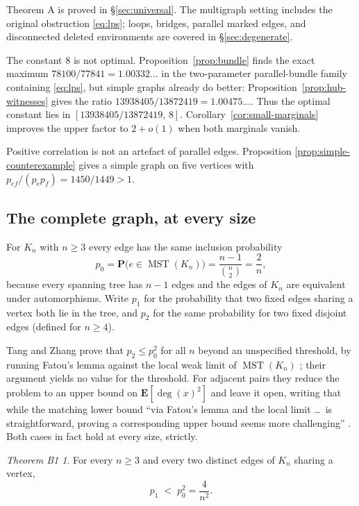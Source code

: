 \documentclass[11pt,a4paper]{amsart}
\theoremstyle{plain}
\theoremstyle{definition}
\theoremstyle{remark}
\newtheorem*{theoremB1}{Theorem B1}
\newcommand{\MST}{\operatorname{MST}}
\newcommand{\E}{\mathbf{E}}
\newcommand{\PP}{\mathbf{P}}
\DeclareMathOperator{\dg}{deg}
\begin{document}
Theorem A is proved in \S\ref{sec:universal}. The multigraph setting includes
the original obstruction \eqref{eq:lps}; loops, bridges, parallel marked edges,
and disconnected deleted environments are covered in
\S\ref{sec:degenerate}.

The constant $8$ is not optimal. Proposition~\ref{prop:bundle} finds the exact
maximum $78100/77841=1.00332\ldots$ in the two-parameter parallel-bundle family
containing \eqref{eq:lps}, but simple graphs already do better:
Proposition~\ref{prop:hub-witnesses} gives the ratio
$13938405/13872419=1.00475\ldots$. Thus the optimal constant lies in
$[13938405/13872419,\,8]$. Corollary~\ref{cor:small-marginals} improves the
upper factor to $2+o(1)$ when both marginals vanish.

Positive correlation is not an artefact of parallel edges. Proposition
\ref{prop:simple-counterexample} gives a simple graph on five vertices with
$p_{ef}/(p_ep_f)=1450/1449>1$.

\subsection{The complete graph, at every size}
\label{ssec:introB}

For $K_n$ with $n\ge3$ every edge has the same inclusion probability
\begin{equation}
\label{eq:p0}
p_0=\PP\bigl(e\in\MST(K_n)\bigr)=\frac{n-1}{\binom n2}=\frac2n ,
\end{equation}
because every spanning tree has $n-1$ edges and the edges of $K_n$ are
equivalent under automorphisms. Write $p_1$ for the probability that two fixed
edges sharing a vertex both lie in the tree, and $p_2$ for the same probability
for two fixed disjoint edges (defined for $n\ge4$).

Tang and Zhang \cite[Theorem 1.1]{TZ} prove that $p_2\le p_0^2$ for all $n$
beyond an unspecified threshold, by running Fatou's lemma against the local weak
limit of $\MST(K_n)$ \cite{ABerry}; their argument yields no value for the
threshold. For adjacent pairs they reduce the problem to an upper bound on
$\E[\dg(x)^2]$ and leave it open, writing that while the matching lower bound
``via Fatou's lemma and the local limit \dots\ is straightforward, proving a
corresponding upper bound seems more challenging'' \cite[\S3.2.2]{TZ}. Both
cases in fact hold at every size, strictly.

\begin{theoremB1}
For every $n\ge3$ and every two distinct edges of $K_n$ sharing a vertex,
\[
p_1\;<\;p_0^2=\frac4{n^2}.
\]
\end{theoremB1}
\end{document}
